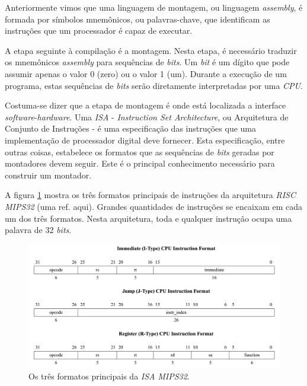 Anteriormente vimos que uma linguagem de montagem, ou linguagem
\textit{assembly}, é formada por símbolos mnemônicos, ou palavras-chave, que
identificam as instruções que um processador é capaz de executar.

A etapa seguinte à compilação é a montagem. Nesta etapa, é necessário traduzir
os mnemônicos \textit{assembly} para sequências de \textit{bits}. Um
\textit{bit} é um dígito que pode assumir apenas o valor 0 (zero) ou o valor 1
(um). Durante a execução de um programa, estas sequências de \textit{bits} serão
diretamente interpretadas por uma \textit{CPU}.

Costuma-se dizer que a etapa de montagem é onde está localizada a interface
\textit{software}-\textit{hardware}. Uma \textit{ISA} - \textit{Instruction Set
Architecture}, ou Arquitetura de Conjunto de Instruções - é uma especificação
das instruções que uma implementação de processador digital deve fornecer. Esta
especificação, entre outras coisas, estabelece os formatos que as sequências de
\textit{bits} geradas por montadores devem seguir. Este é o principal
conhecimento necessário para construir um montador.

A figura \ref{instrucoes_mips} mostra os três formatos principais de instruções
da arquitetura \textit{RISC} \textit{MIPS32} (uma ref. aqui). Grandes
quantidades de instruções se encaixam em cada um dos três formatos. Nesta
arquitetura, toda e qualquer instrução ocupa uma palavra de 32 \textit{bits}.

\begin{figure}[ptb]
  \begin{center}
    \includegraphics[scale=.35]{imagens/instrucoes_mips}
  \end{center}
  \caption{Os três formatos principais da \textit{ISA} \textit{MIPS32}.}
  \label{instrucoes_mips}
\end{figure}


